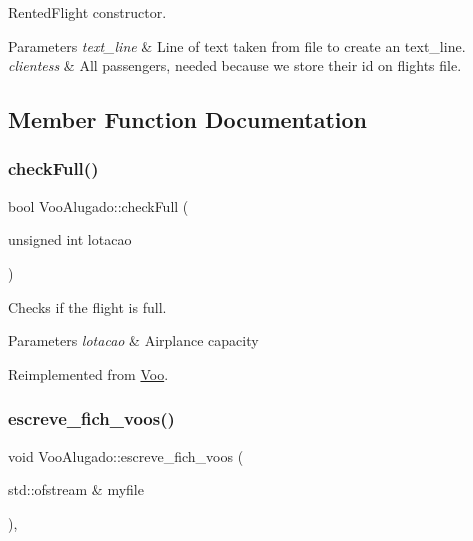 Rented\+Flight constructor. 


\begin{DoxyParams}{Parameters}
{\em text\+\_\+line} & Line of text taken from file to create an text\+\_\+line. \\
\hline
{\em clientess} & All passengers, needed because we store their id on flights file. \\
\hline
\end{DoxyParams}


\subsection{Member Function Documentation}
\mbox{\label{class_voo_alugado_a6ab1f96978f09e8c3477ee9e84259225}} 
\subsubsection{\texorpdfstring{check\+Full()}{checkFull()}}
{\footnotesize\ttfamily bool Voo\+Alugado\+::check\+Full (\begin{DoxyParamCaption}\item[{unsigned int}]{lotacao }\end{DoxyParamCaption})\hspace{0.3cm}{\ttfamily [virtual]}}



Checks if the flight is full. 


\begin{DoxyParams}{Parameters}
{\em lotacao} & Airplance capacity \\
\hline
\end{DoxyParams}


Reimplemented from \hyperlink{class_voo_ae8c7d7254ca23ed23f762a9b867aba91}{Voo}.

\mbox{\label{class_voo_alugado_a183aa2faff077d9a01b54023c1cf3032}} 
\subsubsection{\texorpdfstring{escreve\+\_\+fich\+\_\+voos()}{escreve\_fich\_voos()}}
{\footnotesize\ttfamily void Voo\+Alugado\+::escreve\+\_\+fich\+\_\+voos (\begin{DoxyParamCaption}\item[{std\+::ofstream \&}]{myfile }\end{DoxyParamCaption})\hspace{0.3cm}{\ttfamily [inline]}, {\ttfamily [virtual]}}



